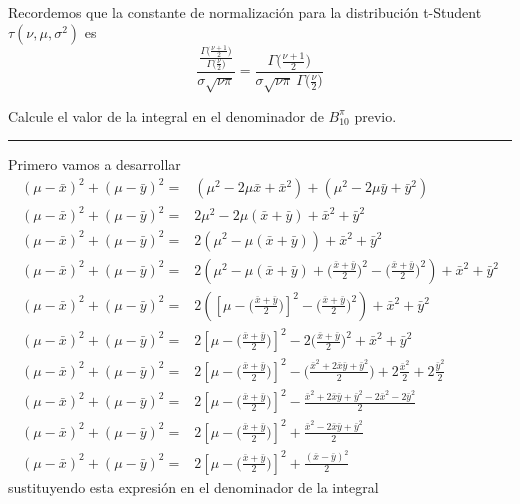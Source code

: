 \documentclass[12pt,]{article}
\begin{document}
Recordemos que la constante de normalización para la distribución
t-Student \(\tau(\nu,\mu,\sigma^2)\) es \[
\displaystyle \frac{\frac{\Gamma\bigg(\frac{\nu+1}{2}\bigg)}{\Gamma\big(\frac{\nu}{2}\big)}}{\sigma\sqrt{\nu\pi}}=\displaystyle \frac{\Gamma\bigg(\frac{\nu+1}{2}\bigg)}{\sigma\sqrt{\nu\pi}\ \Gamma\big(\frac{\nu}{2}\big)}
\]

Calcule el valor de la integral en el denominador de \(B_{10}^\pi\)
previo.

\begin{center}\rule{0.5\linewidth}{\linethickness}\end{center}

Primero vamos a desarrollar \[
\begin{array}{rl}
(\mu-\bar{x})^2+(\mu-\bar{y})^2=&(\mu^2-2\mu\bar{x}+\bar{x}^2)+(\mu^2-2\mu\bar{y}+\bar{y}^2)\\
(\mu-\bar{x})^2+(\mu-\bar{y})^2=&2\mu^2-2\mu(\bar{x}+\bar{y})+\bar{x}^2+\bar{y}^2\\
(\mu-\bar{x})^2+(\mu-\bar{y})^2=&2(\mu^2-\mu(\bar{x}+\bar{y}))+\bar{x}^2+\bar{y}^2\\
(\mu-\bar{x})^2+(\mu-\bar{y})^2=&2(\mu^2-\mu(\bar{x}+\bar{y}) + \big(\frac{\bar{x}+\bar{y}}{2}\big)^2-\big(\frac{\bar{x}+\bar{y}}{2}\big)^2)+\bar{x}^2+\bar{y}^2\\
(\mu-\bar{x})^2+(\mu-\bar{y})^2=&2([\mu- \big(\frac{\bar{x}+\bar{y}}{2}\big)]^2-\big(\frac{\bar{x}+\bar{y}}{2}\big)^2)+\bar{x}^2+\bar{y}^2\\
(\mu-\bar{x})^2+(\mu-\bar{y})^2=&2[\mu- \big(\frac{\bar{x}+\bar{y}}{2}\big)]^2-2\big(\frac{\bar{x}+\bar{y}}{2}\big)^2+\bar{x}^2+\bar{y}^2\\
(\mu-\bar{x})^2+(\mu-\bar{y})^2=&2[\mu- \big(\frac{\bar{x}+\bar{y}}{2}\big)]^2-\big(\frac{\bar{x}^2+2\bar{x}\bar{y}+\bar{y}^2}{2}\big)+2\frac{\bar{x}^2}{2}+2\frac{\bar{y}^2}{2}\\
(\mu-\bar{x})^2+(\mu-\bar{y})^2=&2[\mu- \big(\frac{\bar{x}+\bar{y}}{2}\big)]^2-\frac{\bar{x}^2+2\bar{x}\bar{y}+\bar{y}^2-2\bar{x}^2-2\bar{y}^2}{2}\\
(\mu-\bar{x})^2+(\mu-\bar{y})^2=&2[\mu- \big(\frac{\bar{x}+\bar{y}}{2}\big)]^2+\frac{\bar{x}^2-2\bar{x}\bar{y}+\bar{y}^2}{2}\\
(\mu-\bar{x})^2+(\mu-\bar{y})^2=&2[\mu- \big(\frac{\bar{x}+\bar{y}}{2}\big)]^2+\frac{(\bar{x}-\bar{y})^2}{2}
\end{array}
\] sustituyendo esta expresión en el denominador de la integral
\end{document}
